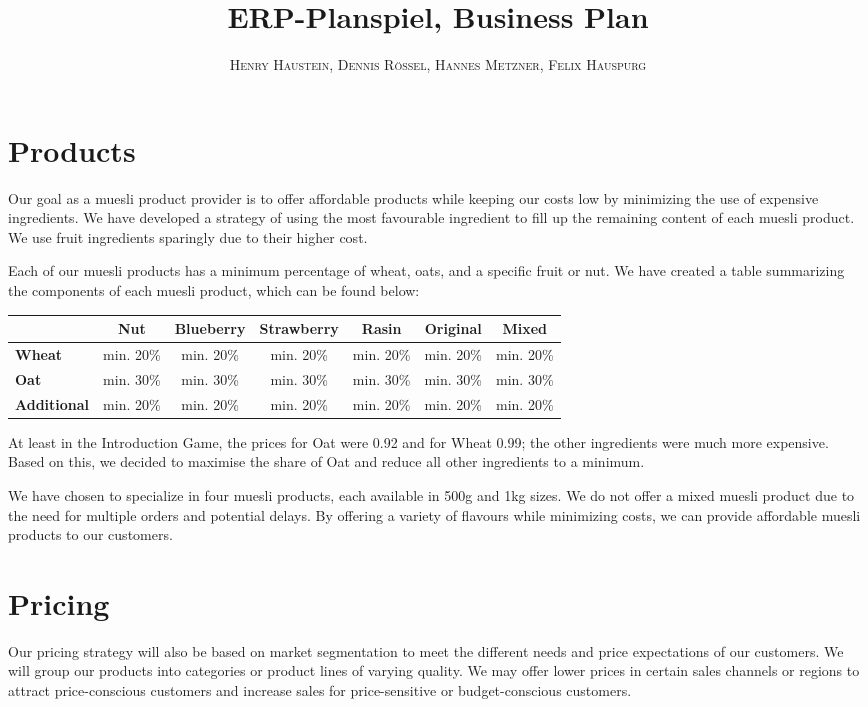 \documentclass{article}
\title{\textbf{ERP-Planspiel, Business Plan}}
\author{\textsc{Henry Haustein}, \textsc{Dennis Rössel}, \textsc{Hannes Metzner}, \textsc{Felix Hauspurg}}
\date{}
\begin{document}
	\maketitle
	
	\section*{Products}
	Our goal as a muesli product provider is to offer affordable products while keeping our costs low by minimizing the use of expensive ingredients. We have developed a strategy of using the most favourable ingredient to fill up the remaining content of each muesli product. We use fruit ingredients sparingly due to their higher cost.
	
	Each of our muesli products has a minimum percentage of wheat, oats, and a specific fruit or nut. We have created a table summarizing the components of each muesli product, which can be found below:
	\begin{center}
		\begin{tabular}{l|c|c|c|c|c|c}
			& \textbf{Nut} & \textbf{Blueberry} & \textbf{Strawberry} & \textbf{Rasin} & \textbf{Original} & \textbf{Mixed} \\
			\hline
			\textbf{Wheat} & min. 20\% & min. 20\% & min. 20\% & min. 20\% & min. 20\% & min. 20\% \\
			\hline
			\textbf{Oat} & min. 30\% & min. 30\% & min. 30\% & min. 30\% & min. 30\% & min. 30\% \\
			\hline
			\textbf{Additional} & min. 20\% & min. 20\% & min. 20\% & min. 20\% & min. 20\% & min. 20\% \\
		\end{tabular}
	\end{center}

	At least in the Introduction Game, the prices for Oat were 0.92 and for Wheat 0.99; the other ingredients were much more expensive. Based on this, we decided to maximise the share of Oat and reduce all other ingredients to a minimum.
	
	We have chosen to specialize in four muesli products, each available in 500g and 1kg sizes. We do not offer a mixed muesli product due to the need for multiple orders and potential delays. By offering a variety of flavours while minimizing costs, we can provide affordable muesli products to our customers.
	
	\section*{Pricing}
	Our pricing strategy will also be based on market segmentation to meet the different needs and price expectations of our customers. We will group our products into categories or product lines of varying quality. We may offer lower prices in certain sales channels or regions to attract price-conscious customers and increase sales for price-sensitive or budget-conscious customers.
	
\end{document}
